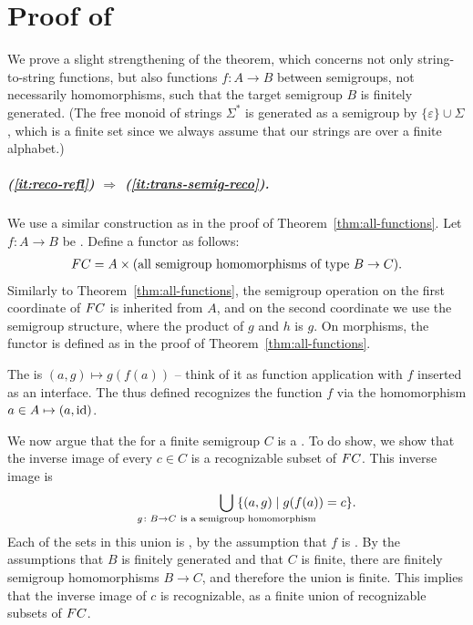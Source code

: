 \section{Proof of~}
We prove a slight strengthening of the theorem, which concerns not only
string-to-string functions, but also functions $f\colon A \to B$ between
semigroups, not necessarily homomorphisms, such that the target semigroup $B$ is
finitely generated. (The free monoid of strings $\Sigma^*$ is generated as a
semigroup by $\{\varepsilon\}\cup\Sigma$, which is a finite set since we always
assume that our strings are over a finite alphabet.)

    \subparagraph{(\ref{it:reco-refl}) $\Rightarrow$ (\ref{it:trans-semig-reco}).}  We  use a similar construction as in the proof of Theorem~\ref{thm:all-functions}. Let  $f\colon A \to B$  be .  Define  a functor as follows: 
    \begin{align*}
        \functor C = A \times \text{(all semigroup homomorphisms of type $B \to C$)}.
    \end{align*}
    Similarly to Theorem~\ref{thm:all-functions}, the semigroup operation on the first coordinate of $\functor C$ is inherited from $A$, and on the second coordinate we use the  semigroup structure,  where the product of $g$ and $h$ is $g$.     On morphisms, the functor is defined as in the proof of Theorem~\ref{thm:all-functions}. 

    The   is $(a,g) \mapsto g(f(a))$ -- think of it as function application with $f$ inserted as an interface. The  thus defined recognizes the function $f$ via the homomorphism $a \in A  \mapsto  (a,\mathrm{id})$.
    
    We now argue that the  for a finite semigroup $C$ is a .
     To do show, we show that the inverse image of every $c \in C$ is a  recognizable subset of $\functor C$. This inverse image is
    \begin{align*}
    \qquad\qquad\qquad\qquad \bigcup_{\mathclap{g\colon B \to C\ \text{is a semigroup homomorphism}}} \; \{(a,g) \mid g(f(a))=c \}.
    \end{align*}
    Each of the sets in this union is , by the assumption that $f$ is .     By the assumptions that $B$ is finitely generated and that $C$ is finite, there are finitely semigroup homomorphisms $B \to C$, and therefore the union is finite. This implies that the inverse image of $c$ is recognizable, as a finite union of recognizable subsets of  $\functor C$.
    
